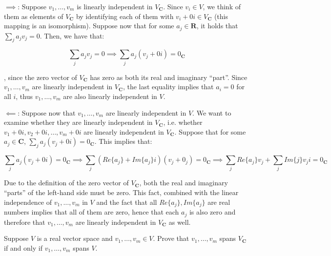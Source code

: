 \begin{solution}

    $\implies$: Suppose $v_1, \ldots, v_m$ is linearly independent in $V_\mathbf{C}$. Since $v_i \in V$, we think of them as elements of $V_\mathbf{C}$ by identifying each of them with $v_i + 0i \in V_\mathbf{C}$ (this mapping is an isomorphism). Suppose now that for some $a_j \in \mathbf{R}$, it holds that $\sum_j a_j v_j = 0$. Then, we have that:
    
    $$\sum_j a_j v_j = 0 \implies \sum_j a_j(v_j + 0i) = 0_\mathbf{C}$$
    
    , since the zero vector of $V_\mathbf{C}$ has zero as both its real and imaginary ``part''. Since $v_1, \ldots, v_m$ are linearly independent in $V_\mathbf{C}$, the last equality implies that $a_i = 0$ for all $i$, thus $v_1, \ldots, v_m$ are also linearly independent in $V$.

    $\impliedby$: Suppose now that $v_1, \ldots, v_m$ are linearly independent in $V$. We want to examine whether they are linearly independent in $V_\mathbf{C}$, i.e. whether $v_1 + 0i, v_2 + 0i, \ldots, v_m + 0i$ are linearly independent in $V_\mathbf{C}$. Suppose that for some $a_j \in \mathbf{C}$, $\sum_j a_j(v_j + 0i) = 0_\mathbf{C}$. This implies that:
    
    $$\sum_j a_j(v_j+0i) = 0_\mathbf{C} \implies \sum_j (Re\{a_j\} + Im\{a_j\}i)(v_j+0_j) = 0_\mathbf{C} \implies \sum_j Re\{a_j\}v_j + \sum_j Im\{j\}v_j i = 0_\mathbf{C}$$

    Due to the definition of the zero vector of $V_\mathbf{C}$, both the real and imaginary ``parts'' of the left-hand side must be zero. This fact, combined with the linear independence of $v_1, \ldots, v_m$ in $V$ and the fact that all $Re\{a_j\}, Im\{a_j\}$ are real numbers implies that all of them are zero, hence that each $a_j$ is also zero and therefore that $v_1, \ldots, v_m$ are linearly independent in $V_\mathbf{C}$ as well.
\end{solution}

\begin{exercise}{4}
    Suppose $V$ is a real vector space and $v_1, \ldots, v_m \in V$. Prove that $v_1, \ldots, v_m$ spans $V_\mathbf{C}$ if and only if $v_1, \ldots, v_m$ spans $V$.
\end{exercise}

